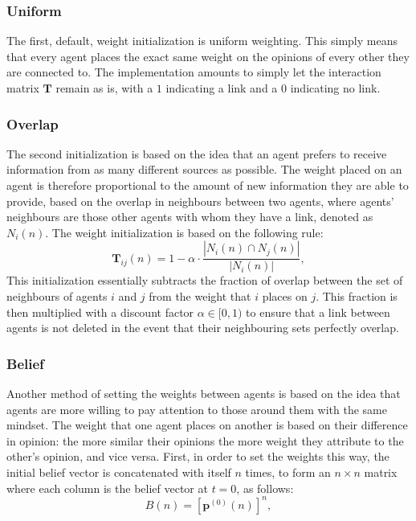 \documentclass[a4paper, 12pt]{report}
\newcommand{\T}{\bm{T}}
\begin{document}
\subsubsection{Uniform}

The first, default, weight initialization is uniform weighting. This simply means that every agent places the exact same weight on the opinions of every other they are connected to. The implementation amounts to simply let the interaction matrix $\T$ remain as is, with a $1$ indicating a link and a $0$ indicating no link.

\subsubsection{Overlap}

The second initialization is based on the idea that an agent prefers to receive information from as many different sources as possible. The weight placed on an agent is therefore proportional to the amount of new information they are able to provide, based on the overlap in neighbours between two agents, where agents' neighbours are those other agents with whom they have a link, denoted as $N_i(n)$. The weight initialization is based on the following rule:
\begin{equation*}
    \T_{ij}(n) = 1 - \alpha \cdot \frac{|N_i(n) \cap N_j(n)|}{|N_i(n)|},
\end{equation*}
This initialization essentially subtracts the fraction of overlap between the set of neighbours of agents $i$ and $j$ from the weight that $i$ places on $j$. This fraction is then multiplied with a discount factor $\alpha \in [0, 1)$ to ensure that a link between agents is not deleted in the event that their neighbouring sets perfectly overlap. 

\subsubsection{Belief}

Another method of setting the weights between agents is based on the idea that agents are more willing to pay attention to those around them with the same mindset. The weight that one agent places on another is based on their difference in opinion: the more similar their opinions the more weight they attribute to the other's opinion, and vice versa. First, in order to set the weights this way, the initial belief vector is concatenated with itself $n$ times, to form an $n \times n$ matrix where each column is the belief vector at $t=0$, as follows:
\begin{equation*}
    B(n) = [\bm{p}^{(0)}(n)]^{n},
\end{equation*}
\end{document}
